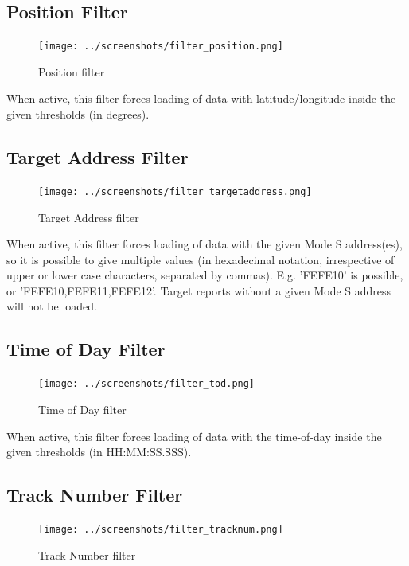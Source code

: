 \subsection{Position Filter}

\begin{figure}[H]
  \center
    \texttt{[image: ../screenshots/filter\_position.png]}
  \caption{Position filter}
\end{figure}

When active, this filter forces loading of data with latitude/longitude inside the given thresholds (in degrees).

\subsection{Target Address Filter}

\begin{figure}[H]
  \center
    \texttt{[image: ../screenshots/filter\_targetaddress.png]}
  \caption{Target Address filter}
\end{figure}

When active, this filter forces loading of data with the given Mode S address(es), so it is possible to give multiple values (in hexadecimal notation, irrespective of upper or lower case characters, separated by commas). E.g. 'FEFE10' is possible, or 'FEFE10,FEFE11,FEFE12'. Target reports without a given Mode S address will not be loaded.

\subsection{Time of Day Filter}

\begin{figure}[H]
  \center
    \texttt{[image: ../screenshots/filter\_tod.png]}
  \caption{Time of Day filter}
\end{figure}

When active, this filter forces loading of data with the time-of-day inside the given thresholds (in HH:MM:SS.SSS).

\subsection{Track Number Filter}

\begin{figure}[H]
  \center
    \texttt{[image: ../screenshots/filter\_tracknum.png]}
  \caption{Track Number filter}
\end{figure}


